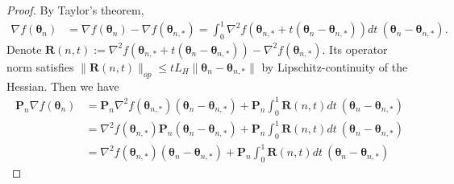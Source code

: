 \documentclass[11pt]{amsart}
\theoremstyle{plain}
\theoremstyle{definition}
\theoremstyle{remark}
\def\bP{\mathbf{P}}
\def\bR{\mathbf{R}}
\def\param{\boldsymbol{\theta}}
\begin{document}
\begin{proof}
    By Taylor's theorem,
   \begin{align*}
       \nabla f(\param_n)&=\nabla f(\param_n) -\nabla f(\param_{n,*})=\int_{0}^{1}\nabla^2f(\param_{n,*}+t(\param_n-\param_{n,*}))dt\  (\param_n-\param_{n,*}).
   \end{align*}
   Denote $\bR(n,t):=\nabla^2f(\param_{n,*}+t(\param_n-\param_{n,*}))-\nabla^2f(\param_{n,*})$. 
   Its operator norm satisfies $\|\bR(n,t)\|_{op}\leq tL_H\|\param_n-\param_{n,*}\|$ by Lipschitz-continuity of the Hessian. Then we have
   \begin{align*}
       \bP_{n}\nabla f(\param_n)&=\bP_{n}\nabla^2f(\param_{n,*})(\param_n-\param_{n,*})+\bP_{n}\int_{0}^{1}\bR(n,t)dt \ (\param_n-\param_{n,*})\\
       &=\nabla^2 f(\param_{n,*})\bP_{n}(\param_n-\param_{n,*})+\bP_{n}\int_{0}^{1}\bR(n,t)dt \ (\param_n-\param_{n,*})\\
        &=\nabla^2 f(\param_{n,*})(\param_n-\param_{n,*})+\bP_{n}\int_{0}^{1}\bR(n,t)dt \ (\param_n-\param_{n,*})
   \end{align*}
   

\end{proof}
\end{document}
